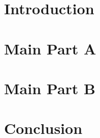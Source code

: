 \begin{tcblisting}
\begin{leaflet}[underlay={\node[above=5mm,font=\footnotesize]
    at (frame.south) {- \arabic{tcbbreakpart} -};}]
  \section{Introduction}
  \lipsum[1]

  \section{Main Part A}
  \lipsum[2-8]

  \section{Main Part B}
  \lipsum[9-15]

  \section{Conclusion}
  \lipsum[16-18]
\end{leaflet}


\end{tcblisting}


